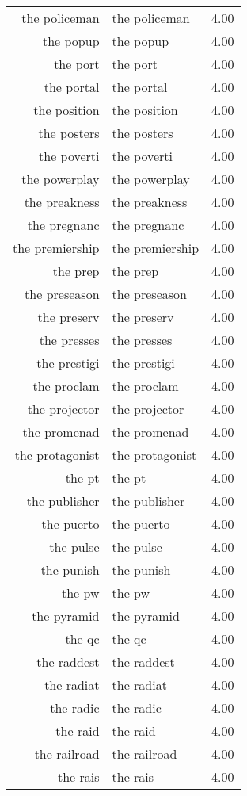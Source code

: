 \begin{table}[ht]
\begin{tabular}{rlr}
  the policeman & the policeman & 4.00 \\ 
  the popup & the popup & 4.00 \\ 
  the port & the port & 4.00 \\ 
  the portal & the portal & 4.00 \\ 
  the position & the position & 4.00 \\ 
  the posters & the posters & 4.00 \\ 
  the poverti & the poverti & 4.00 \\ 
  the powerplay & the powerplay & 4.00 \\ 
  the preakness & the preakness & 4.00 \\ 
  the pregnanc & the pregnanc & 4.00 \\ 
  the premiership & the premiership & 4.00 \\ 
  the prep & the prep & 4.00 \\ 
  the preseason & the preseason & 4.00 \\ 
  the preserv & the preserv & 4.00 \\ 
  the presses & the presses & 4.00 \\ 
  the prestigi & the prestigi & 4.00 \\ 
  the proclam & the proclam & 4.00 \\ 
  the projector & the projector & 4.00 \\ 
  the promenad & the promenad & 4.00 \\ 
  the protagonist & the protagonist & 4.00 \\ 
  the pt & the pt & 4.00 \\ 
  the publisher & the publisher & 4.00 \\ 
  the puerto & the puerto & 4.00 \\ 
  the pulse & the pulse & 4.00 \\ 
  the punish & the punish & 4.00 \\ 
  the pw & the pw & 4.00 \\ 
  the pyramid & the pyramid & 4.00 \\ 
  the qc & the qc & 4.00 \\ 
  the raddest & the raddest & 4.00 \\ 
  the radiat & the radiat & 4.00 \\ 
  the radic & the radic & 4.00 \\ 
  the raid & the raid & 4.00 \\ 
  the railroad & the railroad & 4.00 \\ 
  the rais & the rais & 4.00 \\ 

\end{tabular}
\end{table}
